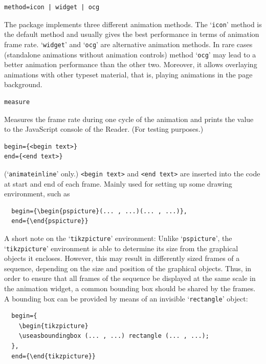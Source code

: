 \documentclass[a4paper]{article}
\begin{document}
\begin{verbatim}
method=icon | widget | ocg
\end{verbatim}
The package implements three different animation methods. The `\verb+icon+' method is the default method and usually gives the best performance in terms of animation frame rate. `\verb+widget+' and `\verb+ocg+' are alternative animation methods. In rare cases (standalone animations without animation controls) method `\verb+ocg+' may lead to a better animation performance than the other two. Moreover, it allows overlaying animations with other typeset material, that is, playing animations in the page background.
\begin{verbatim}
measure
\end{verbatim}
Measures the frame rate during one cycle of the animation and prints the value to the JavaScript console of the Reader. (For testing purposes.)
\hypertarget{beginend}{}%
\begin{verbatim}
begin={<begin text>}
end={<end text>}
\end{verbatim}
(`\verb+animateinline+' only.) \verb+<begin text>+ and \verb+<end text>+ are inserted into the code at start and end of each frame. Mainly used for setting up some drawing environment, such as
\begin{verbatim}
  begin={\begin{pspicture}(... , ...)(... , ...)},
  end={\end{pspicture}}
\end{verbatim}
A short note on the `\verb+tikzpicture+' environment: Unlike `\verb+pspicture+', the `{\tt tikz\-pic\-ture}' environment is able to determine its size from the graphical objects it encloses. However, this may result in differently sized frames of a sequence, depending on the size and position of the graphical objects. Thus, in order to ensure that all frames of the sequence be displayed at the same scale in the animation widget, a common bounding box should be shared by the frames. A bounding box can be provided by means of an invisible `\verb+rectangle+' object:
\begin{verbatim}
  begin={
    \begin{tikzpicture}
    \useasboundingbox (... , ...) rectangle (... , ...);
  },
  end={\end{tikzpicture}}
\end{verbatim}

\end{document}
